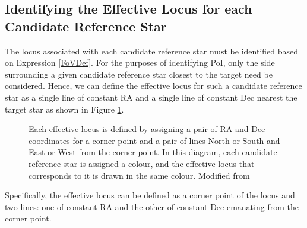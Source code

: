 \documentclass[referee]{aa}
\begin{document}
\subsection{Identifying the Effective Locus for each Candidate Reference Star}
\label{identifying-the-effective-locus-for-each-candidate-reference-star}

The locus associated with each candidate reference star must be
identified based on Expression \ref{FoVDef}. For the purposes of identifying PoI, only the side surrounding a given candidate reference
star closest to the target need be considered. Hence, we can define the
effective locus for such a candidate reference star as a single line of
constant RA and a single line of constant Dec nearest the target star
as shown in Figure \ref{effective_locus}.

\begin{figure}
\caption{\label{effective_locus}Each effective locus is defined by assigning a pair
of RA and Dec coordinates for a corner point and a pair of lines North
or South and East or West from the corner point. In this diagram, each
candidate reference star is assigned a colour, and the effective locus
that corresponds to it is drawn in the same colour. Modified from \citet{creaner2016thesis}}
\end{figure}

Specifically, the effective locus can be defined as a corner point of
the locus and two lines: one of constant RA and the other of constant
Dec emanating from the corner point. 
\end{document}
